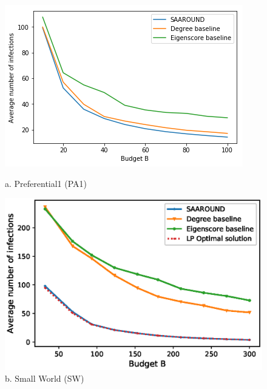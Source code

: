 
\begin{figure}[ht] 
  \begin{minipage}[b]{0.5\linewidth}
    \centering
    \includegraphics[scale=0.47]{Figuresnew/pa1_approx} 
    \caption*{a. Preferential1 (PA1)} 
    \vspace{1.1ex}
  \end{minipage}%
  \begin{minipage}[b]{0.5\linewidth}
    \centering
    \includegraphics[scale=0.47]{Figuresnew/smallworld_approx} 
    \caption*{b. Small World (SW)} 
    \vspace{1.1ex}
  \end{minipage} 

\end{figure}
